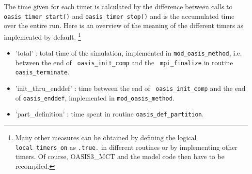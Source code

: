The time given for each timer is calculated by the difference between
calls to {\tt oasis\_timer\_start()} and {\tt oasis\_timer\_stop()}
and is the accumulated time over the entire run. Here is an overview
of the meaning of the different timers as implemented by default.
\footnote{Many other measures can be obtained by defining the logical
{\tt local\_timers\_on} as {\tt .true.} in different routines or by
implementing other timers. Of course, OASIS3\_MCT and the model code then have to be recompiled.}

\begin{itemize}

\item {'total'} : total time of the simulation, implemented
  in {\tt mod\_oasis\_method}, i.e. between the end of {\tt
    oasis\_init\_comp} and the {\tt
    mpi\_finalize} in routine {\tt oasis\_terminate}.

\item {'init\_thru\_enddef'} : time between the end of {\tt
    oasis\_init\_comp} and the end of {\tt oasis\_enddef}, implemented
  in {\tt mod\_oasis\_method}.

\item {'part\_definition'} : time spent in routine {\tt oasis\_def\_partition}.


\end{itemize}
